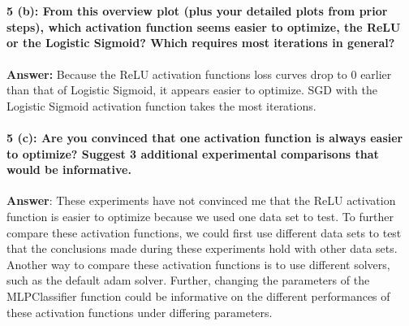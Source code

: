 \documentclass[11pt]{article}
\makeatletter
\newcommand{\boxspacing}{\kern\kvtcb@left@rule\kern\kvtcb@boxsep}
\newcommand{\prompt}[4]{
        {\ttfamily\llap{{\color{#2}[#3]:\hspace{3pt}#4}}\vspace{-\baselineskip}}
    }
\makeatother
\begin{document}
    \begin{center}
    \end{center}
    { \hspace*{\fill} \\}
    
    \hypertarget{b-from-this-overview-plot-plus-your-detailed-plots-from-prior-steps-which-activation-function-seems-easier-to-optimize-the-relu-or-the-logistic-sigmoid-which-requires-most-iterations-in-general}{%
\paragraph{5 (b): From this overview plot (plus your detailed plots from
prior steps), which activation function seems easier to optimize, the
ReLU or the Logistic Sigmoid? Which requires most iterations in
general?}\label{b-from-this-overview-plot-plus-your-detailed-plots-from-prior-steps-which-activation-function-seems-easier-to-optimize-the-relu-or-the-logistic-sigmoid-which-requires-most-iterations-in-general}}

    \textbf{Answer:} Because the ReLU activation functions loss curves drop
to 0 earlier than that of Logistic Sigmoid, it appears easier to
optimize. SGD with the Logistic Sigmoid activation function takes the
most iterations.

    \hypertarget{c-are-you-convinced-that-one-activation-function-is-always-easier-to-optimize-suggest-3-additional-experimental-comparisons-that-would-be-informative.}{%
\paragraph{5 (c): Are you convinced that one activation function is
always easier to optimize? Suggest 3 additional experimental comparisons
that would be
informative.}\label{c-are-you-convinced-that-one-activation-function-is-always-easier-to-optimize-suggest-3-additional-experimental-comparisons-that-would-be-informative.}}

    \textbf{Answer}: These experiments have not convinced me that the ReLU
activation function is easier to optimize because we used one data set
to test. To further compare these activation functions, we could first
use different data sets to test that the conclusions made during these
experiments hold with other data sets. Another way to compare these
activation functions is to use different solvers, such as the default
adam solver. Further, changing the parameters of the MLPClassifier
function could be informative on the different performances of these
activation functions under differing parameters.

    \begin{tcolorbox}[breakable, size=fbox, boxrule=1pt, pad at break*=1mm,colback=cellbackground, colframe=cellborder]
\prompt{In}{incolor}{ }{\boxspacing}
\begin{Verbatim}[commandchars=\\\{\}]

\end{Verbatim}
\end{tcolorbox}


    
    
    
\end{document}

